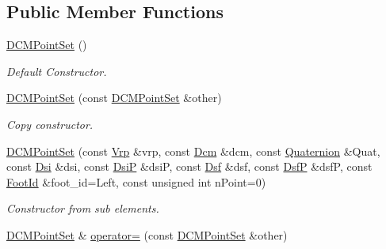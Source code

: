 \subsection*{Public Member Functions}
\begin{DoxyCompactItemize}
\item 
\hyperlink{classow__core_1_1DCMPointSet_a000b4bf3f73576c1941e9947fccf32ad}{D\+C\+M\+Point\+Set} ()\hypertarget{classow__core_1_1DCMPointSet_a000b4bf3f73576c1941e9947fccf32ad}{}\label{classow__core_1_1DCMPointSet_a000b4bf3f73576c1941e9947fccf32ad}

\begin{DoxyCompactList}\small\item\em Default Constructor. \end{DoxyCompactList}\item 
\hyperlink{classow__core_1_1DCMPointSet_afc983ee3d74d48c900312e106b967308}{D\+C\+M\+Point\+Set} (const \hyperlink{classow__core_1_1DCMPointSet}{D\+C\+M\+Point\+Set} \&other)\hypertarget{classow__core_1_1DCMPointSet_afc983ee3d74d48c900312e106b967308}{}\label{classow__core_1_1DCMPointSet_afc983ee3d74d48c900312e106b967308}

\begin{DoxyCompactList}\small\item\em Copy constructor. \end{DoxyCompactList}\item 
\hyperlink{classow__core_1_1DCMPointSet_aebb90b03ac8ce887a73a91bc53dbbd3e}{D\+C\+M\+Point\+Set} (const \hyperlink{classow__core_1_1VirtualRepellentPoint}{Vrp} \&vrp, const \hyperlink{classow__core_1_1DCMWaypoint}{Dcm} \&dcm, const \hyperlink{classow__core_1_1AngularPosition}{Quaternion} \&Quat, const \hyperlink{classow__core_1_1DCMWaypointDSInitial}{Dsi} \&dsi, const \hyperlink{classow__core_1_1DCMWaypointDSInitialVelocity}{DsiP} \&dsiP, const \hyperlink{classow__core_1_1DCMWaypointDSFinal}{Dsf} \&dsf, const \hyperlink{classow__core_1_1DCMWaypointDSFinalVelocity}{DsfP} \&dsfP, const \hyperlink{foot__id_8h_a57e66d30579b22cfe2c17c739278e5a6}{Foot\+Id} \&foot\+\_\+id=Left, const unsigned int n\+Point=0)\hypertarget{classow__core_1_1DCMPointSet_aebb90b03ac8ce887a73a91bc53dbbd3e}{}\label{classow__core_1_1DCMPointSet_aebb90b03ac8ce887a73a91bc53dbbd3e}

\begin{DoxyCompactList}\small\item\em Constructor from sub elements. \end{DoxyCompactList}\item 
\hyperlink{classow__core_1_1DCMPointSet}{D\+C\+M\+Point\+Set} \& \hyperlink{classow__core_1_1DCMPointSet_acb3e5691838b8e6a8fadfb76daf006c9}{operator=} (const \hyperlink{classow__core_1_1DCMPointSet}{D\+C\+M\+Point\+Set} \&other)\hypertarget{classow__core_1_1DCMPointSet_acb3e5691838b8e6a8fadfb76daf006c9}{}\label{classow__core_1_1DCMPointSet_acb3e5691838b8e6a8fadfb76daf006c9}


\end{DoxyCompactItemize}
